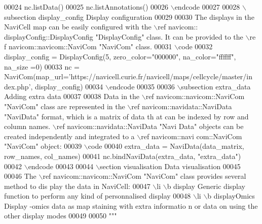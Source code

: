 \begin{DoxyCode}
00024 \textcolor{stringliteral}{nc.listData()}
00025 \textcolor{stringliteral}{nc.listAnnotations()}
00026 \textcolor{stringliteral}{\(\backslash\)endcode}
00027 \textcolor{stringliteral}{}
00028 \textcolor{stringliteral}{\(\backslash\)subsection display\_config Display configuration}
00029 \textcolor{stringliteral}{}
00030 \textcolor{stringliteral}{The displays in the NaviCell map can be easily configured with the \(\backslash\)ref navicom::
      displayConfig::DisplayConfig "DisplayConfig" class. It can be provided to the \(\backslash\)re
      f navicom::navicom::NaviCom "NaviCom" class.}
00031 \textcolor{stringliteral}{\(\backslash\)code}
00032 \textcolor{stringliteral}{display\_config = DisplayConfig(5, zero\_color="000000", na\_color="ffffff", na\_size
      =0)}
00033 \textcolor{stringliteral}{nc = NaviCom(map\_url='https://navicell.curie.fr/navicell/maps/cellcycle/master/in
      dex.php', display\_config)}
00034 \textcolor{stringliteral}{\(\backslash\)endcode}
00035 \textcolor{stringliteral}{}
00036 \textcolor{stringliteral}{\(\backslash\)subsection extra\_data Adding extra data}
00037 \textcolor{stringliteral}{}
00038 \textcolor{stringliteral}{Data in the \(\backslash\)ref navicom::navicom::NaviCom "NaviCom" class are represented in the
       \(\backslash\)ref navicom::navidata::NaviData "NaviData" format, which is a matrix of data th
      at can be indexed by row and column names. \(\backslash\)ref navicom::navidata::NaviData "Navi
      Data" objects can be created independently and integrated to a \(\backslash\)ref navicom::navi
      com::NaviCom "NaviCom" object:}
00039 \textcolor{stringliteral}{\(\backslash\)code}
00040 \textcolor{stringliteral}{extra\_data = NaviData(data\_matrix, row\_names, col\_names)}
00041 \textcolor{stringliteral}{nc.bindNaviData(extra\_data, "extra\_data")}
00042 \textcolor{stringliteral}{\(\backslash\)endcode}
00043 \textcolor{stringliteral}{}
00044 \textcolor{stringliteral}{\(\backslash\)section visualisation Data visualisation}
00045 \textcolor{stringliteral}{}
00046 \textcolor{stringliteral}{The \(\backslash\)ref navicom::navicom::NaviCom "NaviCom" class provides several method to dis
      play the data in NaviCell:}
00047 \textcolor{stringliteral}{    \(\backslash\)li \(\backslash\)b display Generic display function to perform any kind of personnalised 
      display}
00048 \textcolor{stringliteral}{    \(\backslash\)li \(\backslash\)b displayOmics Display -omics data as map staining with extra informatio
      n or data on using the other display modes}
00049 \textcolor{stringliteral}{}
00050 \textcolor{stringliteral}{"""}
\end{DoxyCode}
